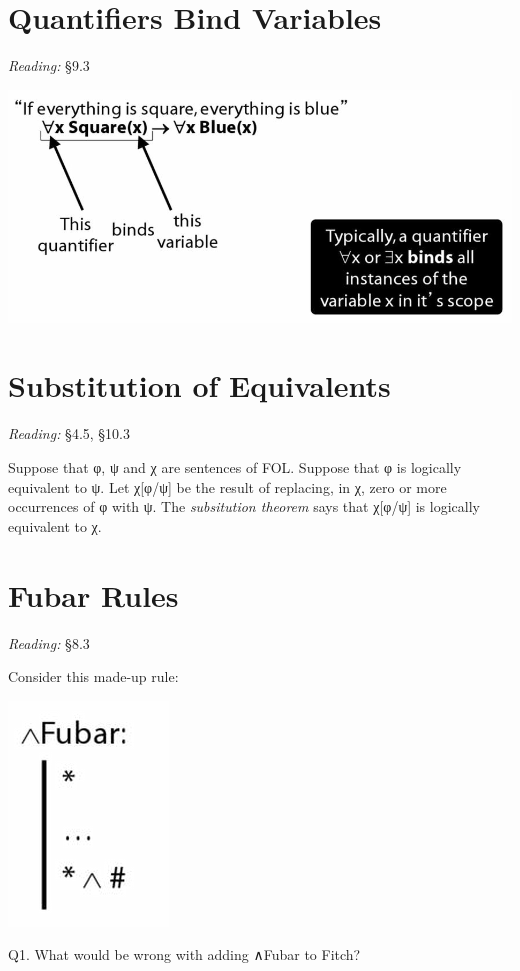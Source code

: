\documentclass[12pt]{extarticle}
\begin{document}
\begin{multicols*}{3}
\begin{minipage}{\columnwidth}
\end{minipage}
 
 
 
\section{Quantifiers Bind Variables}
 
\emph{Reading:} §9.3
 
\begin{center}
\includegraphics[scale=0.3]{img/quantifiers_scope.png}
\end{center}
 
 
\section{Substitution of Equivalents}
 
\emph{Reading:} §4.5, §10.3
 
Suppose that φ, ψ and χ are sentences of FOL. Suppose that φ is logically equivalent to ψ. Let χ[φ/ψ] be the result of replacing, in χ, zero or more occurrences of φ with ψ. The \emph{subsitution theorem} says that χ[φ/ψ] is logically equivalent to χ.
 
 
 
\section{Fubar Rules}
 
\emph{Reading:} §8.3
 
\begin{minipage}{\columnwidth}
 
Consider this made-up rule:
 
\begin{center}
\includegraphics[scale=0.3]{img/fubar_rule.png}
\end{center}
Q1. What would be wrong with adding ∧Fubar to Fitch?
 

\end{minipage}
\end{multicols*}
\end{document}
